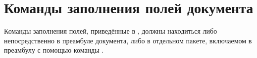 
\section{Команды заполнения полей документа}

Команды заполнения полей, приведённые в , должны
находиться либо непосредственно в преамбуле документа, либо в отдельном пакете,
включаемом в преамбулу с помощью команды .

